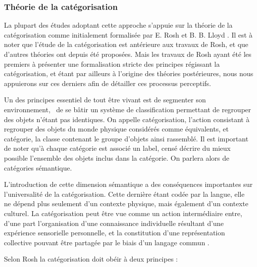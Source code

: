 \subsubsection{Théorie de la catégorisation}

La plupart des études adoptant cette approche s'appuie sur la théorie de la catégorisation comme initialement formalisée par E. Rosh et B. B. Lloyd \cite{roach1978cognition}. Il est à noter que l'étude de la catégorisation est antérieure aux travaux de Rosh, et que d'autres théories ont depuis été proposées. Mais les travaux de Rosh ayant été les premiers à présenter une formalisation stricte des principes régissant la catégorisation, et étant par ailleurs à l'origine des théories postérieures, nous nous appuierons sur ces derniers afin de détailler ces processus perceptifs. 


Un des principes essentiel de tout être vivant est de segmenter son environnement, \ie~de se bâtir un système de classification permettant de regrouper des objets n'étant pas identiques. On appelle catégorisation, l'action consistant à regrouper des objets du monde physique considérés comme équivalents, et catégorie, la classe contenant le groupe d'objets ainsi rassemblé. Il est important de noter qu'à chaque catégorie est associé un label, censé décrire du mieux possible l'ensemble des objets inclus dans la catégorie. On parlera alors de catégories sémantique. 

L'introduction de cette dimension sémantique a des conséquences importantes sur l'universalité de la catégorisation. Cette dernière étant codée par la langue, elle ne dépend plus seulement d'un contexte physique, mais également d'un contexte culturel. La catégorisation peut être vue comme un action intermédiaire entre, d'une part l'organisation d'une connaissance individuelle résultant d'une expérience sensorielle personnelle, et la constitution d'une représentation collective pouvant être partagée par le biais d'un langage commun \cite{dubois2006cognitive}. 

Selon Rosh la catégorisation doit obéir à deux principes \citep[p. 29]{roach1978cognition}:

